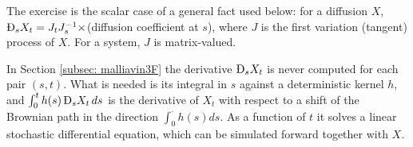 The exercise is the scalar case of a general fact used below: for a diffusion $X$, $\MD_sX_t=J_tJ_s^{-1}\times$(diffusion coefficient at $s$), where $J$ is the first variation (tangent) process of $X$. For a system, $J$ is matrix-valued.

In Section \ref{subsec: malliavin3F} the derivative $\MD_sX_t$ is never computed for each pair $(s,t)$. What is needed is its integral in $s$ against a deterministic kernel $h$, and $\int_0^th(s)\,\MD_sX_t\,ds$ is the derivative of $X_t$ with respect to a shift of the Brownian path in the direction $\int_0^\cdot h(s)ds$. As a function of $t$ it solves a linear stochastic differential equation, which can be simulated forward together with $X$.
